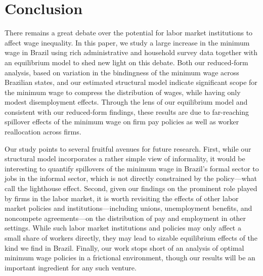
\section{Conclusion\label{SECTION: Conclusion}}

There remains a great debate over the potential for labor market institutions to affect wage inequality. In this paper, we study a large increase in the minimum wage in Brazil using rich administrative and household survey data together with an equilibrium model to shed new light on this debate. Both our reduced-form analysis, based on variation in the bindingness of the minimum wage across Brazilian states, and our estimated structural model indicate significant scope for the minimum wage to compress the distribution of wages, while having only modest disemployment effects. Through the lens of our equilibrium model and consistent with our reduced-form findings, these results are due to far-reaching spillover effects of the minimum wage on firm pay policies as well as worker reallocation across firms.

Our study points to several fruitful avenues for future research. First, while our structural model incorporates a rather simple view of informality, it would be interesting to quantify spillovers of the minimum wage in Brazil's formal sector to jobs in the informal sector, which is not directly constrained by the policy---what \citet{NeriMoura2006} call the lighthouse effect. Second, given our findings on the prominent role played by firms in the labor market, it is worth revisiting the effects of other labor market policies and institutions---including unions, unemployment benefits, and noncompete agreements---on the distribution of pay and employment in other settings. While such labor market institutions and policies may only affect a small share of workers directly, they may lead to sizable equilibrium effects of the kind we find in Brazil. Finally, our work stops short of an analysis of optimal minimum wage policies in a frictional environment, though our results will be an important ingredient for any such venture.

